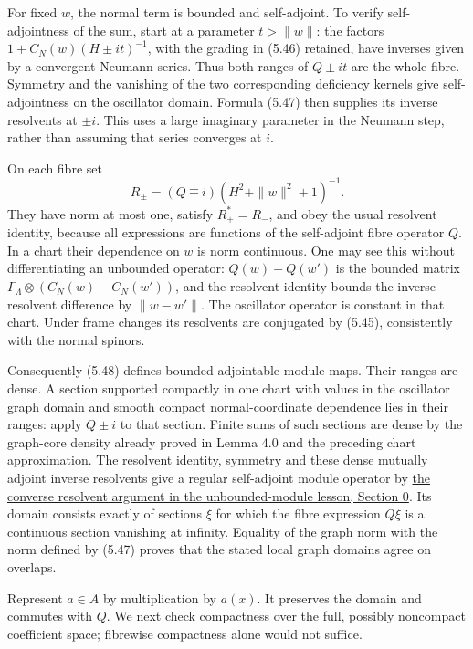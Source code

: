 \documentclass[
  11pt,
]{article}
\begin{document}
For fixed \(w\), the normal term is bounded and self-adjoint. To verify
self-adjointness of the sum, start at a parameter \(t>\|w\|\): the
factors \(1+C_N(w)(H\pm it)^{-1}\), with the grading in (5.46) retained,
have inverses given by a convergent Neumann series. Thus both ranges of
\(Q\pm it\) are the whole fibre. Symmetry and the vanishing of the two
corresponding deficiency kernels give self-adjointness on the oscillator
domain. Formula (5.47) then supplies its inverse resolvents at
\(\pm i\). This uses a large imaginary parameter in the Neumann step,
rather than assuming that series converges at \(i\).

On each fibre set \[
R_\pm=(Q\mp i)(H^2+\|w\|^2+1)^{-1}.
\tag{5.48}
\] They have norm at most one, satisfy \(R_+^*=R_-\), and obey the usual
resolvent identity, because all expressions are functions of the
self-adjoint fibre operator \(Q\). In a chart their dependence on \(w\)
is norm continuous. One may see this without differentiating an
unbounded operator: \(Q(w)-Q(w')\) is the bounded matrix
\(\Gamma_\Lambda\otimes(C_N(w)-C_N(w'))\), and the resolvent identity
bounds the inverse-resolvent difference by \(\|w-w'\|\). The oscillator
operator is constant in that chart. Under frame changes its resolvents
are conjugated by (5.45), consistently with the normal spinors.

Consequently (5.48) defines bounded adjointable module maps. Their
ranges are dense. A section supported compactly in one chart with values
in the oscillator graph domain and smooth compact normal-coordinate
dependence lies in their ranges: apply \(Q\pm i\) to that section.
Finite sums of such sections are dense by the graph-core density already
proved in Lemma 4.0 and the preceding chart approximation. The resolvent
identity, symmetry and these dense mutually adjoint inverse resolvents
give a regular self-adjoint module operator by
\href{KT-KK-11.html\#0-regular-calculus-localization-and-compact-supports}{the
converse resolvent argument in the unbounded-module lesson, Section 0}.
Its domain consists exactly of sections \(\xi\) for which the fibre
expression \(Q\xi\) is a continuous section vanishing at infinity.
Equality of the graph norm with the norm defined by (5.47) proves that
the stated local graph domains agree on overlaps.

Represent \(a\in A\) by multiplication by \(a(x)\). It preserves the
domain and commutes with \(Q\). We next check compactness over the full,
possibly noncompact coefficient space; fibrewise compactness alone would
not suffice.
\end{document}
